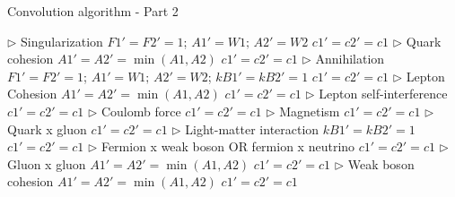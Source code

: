 \documentclass[12pt]{article}
\begin{document}
\begin{algorithm}
    \caption{Convolution algorithm - Part 2}
    \label{algo:convolution2}
    \small
    \begin{algorithmic}[1]
         
            \State $\triangleright$ Singularization
            \State $F1'=F2'=1$; $A1'=W1;\,A2'=W2$
            \State $c1'=c2'=c1$ 
         
                \State $\triangleright$ Quark cohesion
                \State $A1'=A2'=\min(A1, A2)$
                \State $c1'=c2'=c1$  
                \State $\triangleright$ Annihilation
                \State $F1'=F2'=1$; $A1'=W1;\,A2'=W2$; $kB1'=kB2'=1$
                \State $c1'=c2'=c1$  
                    \State $\triangleright$ Lepton Cohesion
                    \State $A1'=A2'=\min(A1, A2)$
                    \State $c1'=c2'=c1$  
                    \State $\triangleright$ Lepton self-interference
                    \State $c1'=c2'=c1$  
                \EndIf    
                \State $\triangleright$ Coulomb force
                \State $c1'=c2'=c1$  
                \State $\triangleright$ Magnetism
                \State $c1'=c2'=c1$  
            \EndIf   
         
                \State $\triangleright$ Quark x gluon
                \State $c1'=c2'=c1$  
                    \State $\triangleright$ Light-matter interaction
                    \State $kB1'=kB2'=1$
                    \State $c1'=c2'=c1$  
                    \State $\triangleright$ Fermion x weak boson OR fermion x neutrino
                    \State $c1'=c2'=c1$  
                \EndIf        
            \EndIf   
         
                \State $\triangleright$ Gluon x gluon
                \State $A1'=A2'=\min(A1, A2)$
                \State $c1'=c2'=c1$  
                \State $\triangleright$ Weak boson cohesion
                \State $A1'=A2'=\min(A1, A2)$
                \State $c1'=c2'=c1$  
            \EndIf   
        \EndIf   
    \end{algorithmic}
\end{algorithm}
\end{document}
